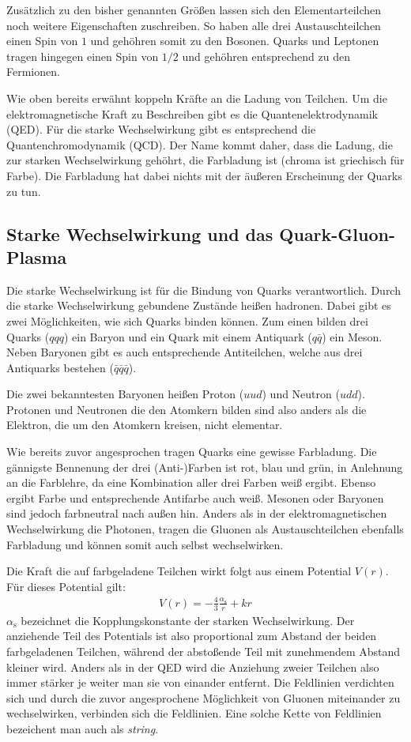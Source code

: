 \documentclass[11pt]{article}
\begin{document}
Zus\"atzlich zu den bisher genannten Gr\"o{\ss}en lassen sich den Elementarteilchen noch weitere Eigenschaften zuschreiben. So haben alle drei Austauschteilchen einen Spin von $1$ und geh\"ohren somit zu den Bosonen. Quarks und Leptonen tragen hingegen einen Spin von $1/2$ und geh\"ohren entsprechend zu den Fermionen.

Wie oben bereits erw\"ahnt koppeln Kr\"afte an die Ladung von Teilchen. Um die elektromagnetische Kraft zu Beschreiben gibt es die Quantenelektrodynamik (QED). F\"ur die starke Wechselwirkung gibt es entsprechend die Quantenchromodynamik (QCD). Der Name kommt daher, dass die Ladung, die zur starken Wechselwirkung geh\"ohrt, die Farbladung ist (chroma ist griechisch für Farbe). Die Farbladung hat dabei nichts mit der \"au{\ss}eren Erscheinung der Quarks zu tun.

\subsection{Starke Wechselwirkung und das Quark-Gluon-Plasma}
Die starke Wechselwirkung ist für die Bindung von Quarks verantwortlich. Durch die starke Wechselwirkung gebundene Zust\"ande hei{\ss}en hadronen. Dabei gibt es zwei M\"oglichkeiten, wie sich Quarks binden k\"onnen. Zum einen bilden drei Quarks ($qqq$) ein Baryon und ein Quark mit einem Antiquark ($q\bar{q}$) ein Meson. Neben Baryonen gibt es auch entsprechende Antiteilchen, welche aus drei Antiquarks bestehen ($\bar{q}\bar{q}\bar{q}$).

Die zwei bekanntesten Baryonen hei{\ss}en Proton ($uud$) und Neutron ($udd$). Protonen und Neutronen die den Atomkern bilden sind also anders als die Elektron, die um den Atomkern kreisen, nicht elementar.

Wie bereits zuvor angesprochen tragen Quarks eine gewisse Farbladung. Die g\"annigste Bennenung der drei (Anti-)Farben ist rot, blau und gr\"un, in Anlehnung an die Farblehre, da eine Kombination aller drei Farben wei{\ss} ergibt. Ebenso ergibt Farbe und entsprechende Antifarbe auch wei{\ss}.
Mesonen oder Baryonen sind jedoch farbneutral nach au{\ss}en hin.
Anders als in der elektromagnetischen Wechselwirkung die Photonen, tragen die Gluonen als Austauschteilchen ebenfalls Farbladung und können somit auch selbst wechselwirken.

Die Kraft die auf farbgeladene Teilchen wirkt folgt aus einem Potential $V(r)$. F\"ur dieses Potential gilt:
\begin{align} \label{eq:Potential}
V(r) = -\frac{4}{3}\frac{\alpha_\text{s}}{r} + kr
\end{align}
$\alpha_\text{s}$ bezeichnet die Kopplungskonstante der starken Wechselwirkung. Der anziehende Teil des Potentials ist also proportional zum Abstand der beiden farbgeladenen Teilchen, w\"ahrend der absto{\ss}ende Teil mit zunehmendem Abstand kleiner wird. Anders als in der QED wird die Anziehung zweier Teilchen also immer stärker je weiter man sie von einander entfernt. Die Feldlinien verdichten sich und durch die zuvor angesprochene M\"oglichkeit von Gluonen miteinander zu wechselwirken, verbinden sich die Feldlinien. Eine solche Kette von Feldlinien bezeichent man auch als \textit{string}. 
\end{document}
